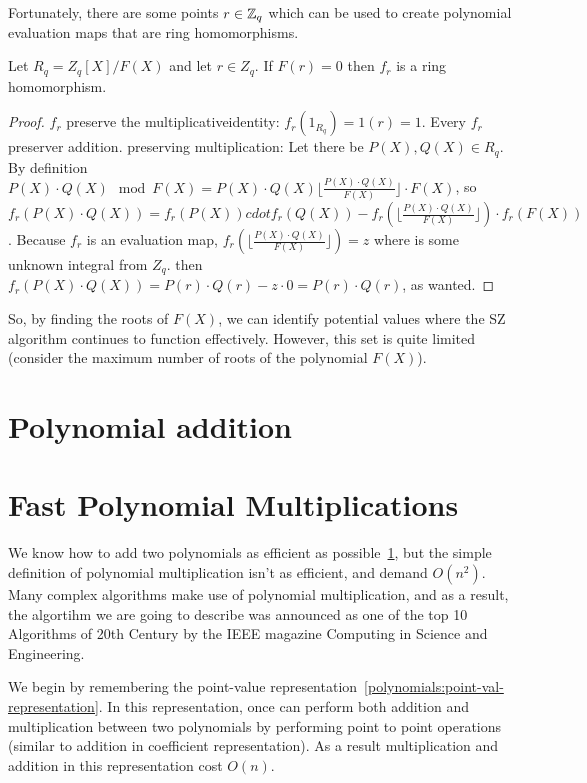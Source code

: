 Fortunately, there are some points $r\in \mathbb{Z}_q$ which can be used to create polynomial evaluation maps that 
are ring homomorphisms.
\begin{theorem}
  Let $R_q=Z_q[X]/F(X)$ and let $r\in Z_q$. If $F(r)=0$ then $f_r$ is a ring homomorphism.
\end{theorem}
\begin{proof}
  $f_r$ preserve the multiplicativeidentity: $f_r(1_{R_q}) = 1(r)=1$.
  Every $f_r$ preserver addition.
  preserving multiplication:
  Let there be $P(X), Q(X) \in R_q$. 
  By definition $P(X)\cdot Q(X) \mod F(X) = P(X)\cdot Q(X) \lfloor \frac{P(X)\cdot Q(X)}{F(X)} \rfloor \cdot F(X)$,
  so $f_r(P(X)\cdot Q(X))= f_r(P(X))cdot f_r(Q(X)) - f_r(\lfloor  \frac{P(X)\cdot Q(X)}{F(X)} \rfloor)\cdot f_r(F(X))$.
  Because $f_r$ is an evaluation map, $f_r(\lfloor  \frac{P(X)\cdot Q(X)}{F(X)} \rfloor)=z$ where is some unknown integral from $Z_q$.
  then $f_r(P(X)\cdot Q(X)) =P(r)\cdot Q(r) - z \cdot 0= P(r)\cdot Q(r)$, as wanted.
\end{proof}

So, by finding the roots of $F(X)$, we can identify potential values where 
the SZ algorithm continues to function effectively. 
However, this set is quite limited (consider the maximum number of roots of the polynomial $F(X)$).

\section{Polynomial addition}\label{polynomials:addition}
\section{Fast Polynomial Multiplications}\label{polynomial:multiplication}\label{section:fft}

We know how to add two polynomials as efficient as possible~\ref{polynomials:addition},
but the simple definition of polynomial multiplication isn't as efficient, and demand $O(n^2)$.
Many complex algorithms make use of polynomial multiplication, and as a result, the algortihm 
we are going to describe was announced as one of the top 10 Algorithms of 20th
Century by the IEEE magazine Computing in Science and Engineering.\cite{814652}


We begin by remembering the point-value representation~\ref{polynomials:point-val-representation}.
In this representation, once can perform both addition and multiplication between two polynomials 
by performing point to point operations (similar to addition in coefficient representation).
As a result multiplication and addition in this representation cost $O(n)$.



